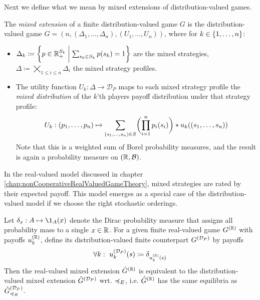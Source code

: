 \documentclass[a4paper]{scrreprt}
\newcommand{\Rp}{\mathbb{R}_+}
\newcommand{\B}{\mathcal{B}}
\newcommand{\D}{\mathcal{D}}
\begin{document}
    Next we define what we mean by mixed extensions of distribution-valued games.
    \begin{defn}
        The \emph{mixed extension} of a finite distribution-valued game $G$ is the distribution-valued game $\hat{G} = (n, (\Delta_1, \dots, \Delta_n), (U_1, \dots, U_n))$,
        where for $k \in \{1, \dots, n\}$:        
        \begin{itemize} %
            \item $\Delta_k \coloneqq \biggset{ p \in \Rp^{S_k} \biggmid \sum_{s_k \in S_k} p(s_k) = 1 } $ are the mixed strategies, $\Delta \coloneqq \bigtimes\limits_{1\leq i \leq n} \Delta_i$ the mixed strategy profiles.
            
            \item
            The utility function $U_k: \Delta \to \D_P$ maps to each mixed strategy profile the \emph{mixed distribution} of the $k$'th players payoff distribution under that strategy profile:
            \begin{gather}
                U_k: 
                (p_1, \dots, p_n) 
                \mapsto
                \sum_{(s_1, \dots, s_n) \in S} \biggl(\prod_{i=1}^{n} p_i(s_i)\biggr) * u_k( (s_1, \dots, s_n) )
                \label{eq:marginalDistMixedStrategyUtility}
            \end{gather}
            Note that this is a weighted sum of Borel probability measures, and the result is again a probability measure on $(\R, \B)$.
        \end{itemize}
    \end{defn}

    In the real-valued model discussed in chapter \ref{chap:nonCooperativeRealValuedGameTheory}, mixed strategies are rated by their expected payoff. This model emerges as a special case of the distribution-valued model if we choose the right stochastic orderings.
    \begin{ex}
        Let $\delta_x: A \mapsto \1_A(x)$ denote the Dirac probability measure that assigns all probability mass to a single $x \in \mathbb{R}$.
        For a given finite real-valued game $G^{(\mathbb{R})}$ with payoffs $u_k^{(\mathbb{R})}$, define its distribution-valued finite counterpart $G^{(\DP)}$ by payoffs
        \begin{gather*}
            \forall k: ~u_k^{(\DP)}(s) \coloneqq \delta_{u_k^{(\R)}(s)} 
        \end{gather*}
        Then the real-valued mixed extension $\hat{G}^{(\mathbb{R})}$ is equivalent to the distribution-valued mixed extension $\hat{G}^{(\DP)}$ wrt. $\preccurlyeq_E$, i.e. 
        $\hat{G}^{(\mathbb{R})}$ has the same equilibria as $\hat{G}^{(\DP)}_{\leqE}$.
    \end{ex}
\end{document}
